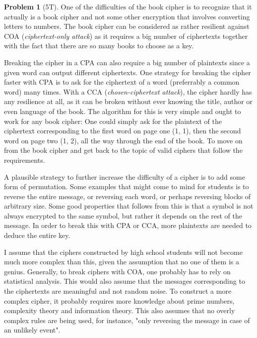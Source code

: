 \documentclass[11pt,twoside]{article}
\theoremstyle{definition}
\newtheorem{amsproblem}{Problem}
\newenvironment{problem}[1][]{%
  \begin{amsproblem}[#1]
  }{%
  \end{amsproblem}
}
\newcommand{\TP}[1]{#1T}
\begin{document}
\begin{problem}[\TP{5}]
  One of the difficulties of the book cipher is to recognize that it actually is a book cipher and not some other encryption that involves converting letters to numbers. The book cipher can be considered as rather resilient against COA (\textit{ciphertext-only attack}) as it requires a big number of ciphertexts together with the fact that there are so many books to choose as a key. 
  
  Breaking the cipher in a CPA can also require a big number of plaintexts since a given word can output different ciphertexts. One strategy for breaking the cipher faster with CPA is to ask for the ciphertext of a word (preferrably a common word) many times. \newline
  With a CCA (\textit{chosen-ciphertext attack}), the cipher hardly has any resilience at all, as it can be broken without ever knowing the title, author or even language of the book. The algorithm for this is very simple and ought to work for any book cipher: One could simply ask for the plaintext of the ciphertext corresponding to the first word on page one (1, 1), then the second word on page two (1, 2), all the way through the end of the book. To move on from the book cipher and get back to the topic of valid ciphers that follow the requirements. \newline
  
  A plausible strategy to further increase the difficulty of a cipher is to add some form of permutation. Some examples that might come to mind for students is to reverse the entire message, or reversing each word, or perhaps reversing blocks of arbitrary size. \newline 
  Some good properties that follows from this is that a symbol is not always encrypted to the same symbol, but rather it depends on the rest of the message. \newline
  In order to break this with CPA or CCA, more plaintexts are needed to deduce the entire key. 
\newline

I assume that the ciphers constructed by high school students will not become much more complex than this, given the assumption that no one of them is a genius. Generally, to break ciphers with COA, one probably has to rely on statistical analysis. This would also assume that the messages corresponding to the ciphertexts are meaningful and not random noise.
To construct a more complex cipher, it probably requires more knowledge about prime numbers, complexity theory and information theory. This also assumes that no overly complex rules are being used, for instance, "only reversing the message in case of an unlikely event".


  
  
\end{problem}
\end{document}
